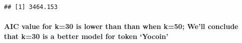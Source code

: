 \documentclass[]{article}
\let\oldparagraph\paragraph
\renewcommand{\paragraph}[1]{\oldparagraph{#1}\mbox{}}
\begin{document}
\begin{verbatim}
## [1] 3464.153
\end{verbatim}

\paragraph{\texorpdfstring{AIC value for k=30 is lower than than when
k=50; We'll conclude that k=30 is a better model for token
`Yocoin'}{AIC value for k=30 is lower than than when k=50; We'll conclude that k=30 is a better model for token Yocoin}}\label{aic-value-for-k30-is-lower-than-than-when-k50-well-conclude-that-k30-is-a-better-model-for-token-yocoin}
\end{document}
